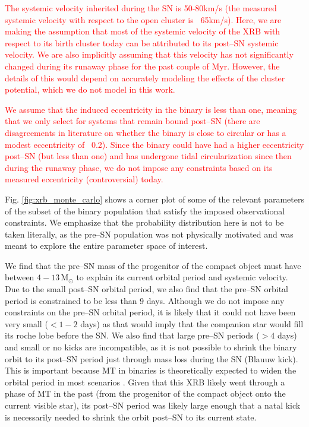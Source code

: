 \documentclass[linenumbers,trackchanges,twocolumn]{aastex701}
\newcommand{\Mdot}{\mathrm{M}_{\odot}}
\newcommand{\red}{\textcolor{red}}
\begin{document}
\red{The systemic velocity inherited during the SN is 50-80km/s (the measured systemic velocity with respect to the open cluster is ~65km/s). Here, we are making the assumption that most of the systemic velocity of the XRB with respect to its birth cluster today can be attributed to its post--SN systemic velocity. We are also implicitly assuming that this velocity has not significantly changed during its runaway phase for the past couple of Myr. However, the details of this would depend on accurately modeling the effects of the cluster potential, which we do not model in this work.}

\red{We assume that the induced eccentricity in the binary is less than one, meaning that we only select for systems that remain bound post--SN (there are disagreements in literature on whether the binary is close to circular or has a modest eccentricity of ~0.2). Since the binary could have had a higher eccentricity post--SN (but less than one) and has undergone tidal circularization since then during the runaway phase, we do not impose any constraints based on its measured eccentricity (controversial) today.}

Fig. \ref{fig:xrb_monte_carlo} shows a corner plot of some of the relevant parameters of the subset of the binary population that satisfy the imposed observational constraints. We emphasize that the probability distribution here is not to be taken literally, as the pre--SN population was not physically motivated and was meant to explore the entire parameter space of interest.

We find that the pre--SN mass of the progenitor of the compact object must have between $4-13\,\Mdot$ to explain its current orbital period and systemic velocity. Due to the small post--SN orbital period, we also find that the pre--SN orbital period is constrained to be less than $9$ days. Although we do not impose any constraints on the pre--SN orbital period, it is likely that it could not have been very small ($<1-2$ days) as that would imply that the companion star would fill its roche lobe before the SN. We also find that large pre--SN periods ($>4$ days) and small or no kicks are incompatible, as it is not possible to shrink the binary orbit to its post--SN period just through mass loss during the SN (Blauuw kick). This is important because MT in binaries is theoretically expected to widen the orbital period in most scenarios \citep{2019A&A...624A..66R}. Given that this XRB likely went through a phase of MT in the past (from the progenitor of the compact object onto the current visible star), its post--SN period was likely large enough that a natal kick is necessarily needed to shrink the orbit post--SN to its current state. 
\end{document}
